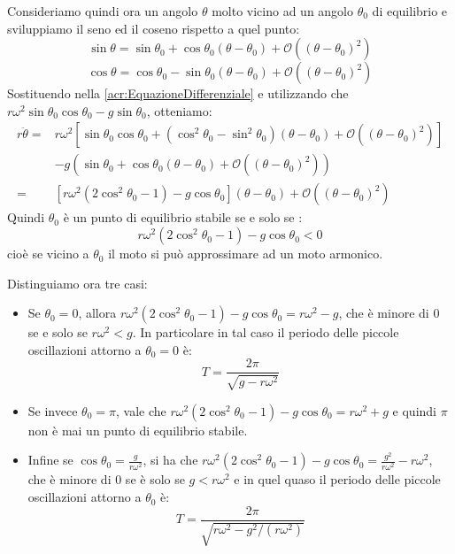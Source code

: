 \documentclass[../main.tex]{subfiles}
\begin{document}
Consideriamo quindi ora un angolo $\theta$ molto vicino ad un angolo $\theta_0$ di equilibrio e sviluppiamo il seno ed 
il coseno rispetto a quel punto:
\begin{equation}\label{acr:SviluppoSeno}
	\sin\theta=\sin\theta_0+\cos\theta_0(\theta-\theta_0)+\mathcal{O}((\theta-\theta_0)^2)
\end{equation}
\begin{equation}\label{acr:SviluppoCoseno}
	\cos\theta=\cos\theta_0-\sin\theta_0(\theta-\theta_0)+\mathcal{O}((\theta-\theta_0)^2)
\end{equation}
Sostituendo nella \cref{acr:EquazioneDifferenziale} e utilizzando che $r\omega^2\sin\theta_0\cos\theta_0-g\sin\theta_0$, 
otteniamo:
\begin{equation*}
\begin{split}
	r\ddot{\theta}	=& r\omega^2\left[\sin\theta_0\cos\theta_0+\left(\cos^2\theta_0-\sin^2\theta_0\right)
					(\theta-\theta_0)+\mathcal{O}((\theta-\theta_0)^2)\right]\\
					& -g\left(\sin\theta_0+\cos\theta_0(\theta-\theta_0)+\mathcal{O}((\theta-\theta_0)^2)\right)\\
					=& \left[ r\omega^2\left(2\cos^2\theta_0-1\right)-g\cos\theta_0 \right](\theta-\theta_0)
					+\mathcal{O}((\theta-\theta_0)^2)
\end{split}
\end{equation*}
Quindi $\theta_0$ è un punto di equilibrio stabile se e solo se :
\begin{equation}\label{}
	r\omega^2\left(2\cos^2\theta_0-1\right)-g\cos\theta_0<0
\end{equation}
cioè se vicino a $\theta_0$ il moto si può approssimare ad un moto armonico.

Distinguiamo ora tre casi:
\begin{itemize}
	\item 	Se $\theta_0=0$, allora $r\omega^2\left(2\cos^2\theta_0-1\right)-g\cos\theta_0=r\omega^2-g$,
			che è minore di 0 se e solo se $r\omega^2<g$. In particolare in tal caso il periodo delle piccole
			oscillazioni attorno a $\theta_0=0$ è:
			\begin{equation*}
				T=\frac{2\pi}{\sqrt{g-r\omega^2}}
			\end{equation*}
	\item	Se invece $\theta_0=\pi$, vale che 
			$r\omega^2\left(2\cos^2\theta_0-1\right)-g\cos\theta_0=r\omega^2+g$ e quindi $\pi$
			non è mai un punto di equilibrio stabile.
	\item	Infine se $\cos\theta_0=\frac{g}{r\omega^2}$, si ha che
			$r\omega^2\left(2\cos^2\theta_0-1\right)-g\cos\theta_0=\frac{g^2}{r\omega^2}-r\omega^2$, che
			è minore di 0 se è solo se $g<r\omega^2$ e in quel quaso il periodo delle piccole oscillazioni
			attorno a $\theta_0$ è:
			\begin{equation*}
				T=\frac{2\pi}{\sqrt{r\omega^2-g^2/(r\omega^2)}}
			\end{equation*}
\end{itemize}
\end{document}
